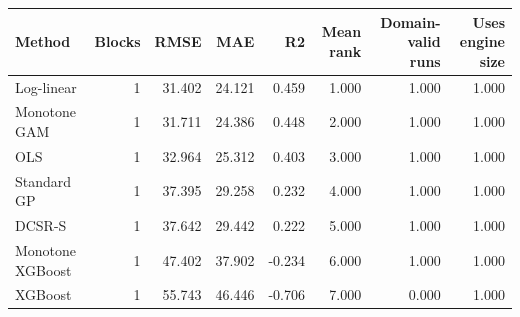 \begin{tabular}{lrrrrrrr}
\toprule
Method & Blocks & RMSE & MAE & R2 & Mean rank & Domain-valid runs & Uses engine size \\
\midrule
Log-linear & 1 & 31.402 & 24.121 & 0.459 & 1.000 & 1.000 & 1.000 \\
Monotone GAM & 1 & 31.711 & 24.386 & 0.448 & 2.000 & 1.000 & 1.000 \\
OLS & 1 & 32.964 & 25.312 & 0.403 & 3.000 & 1.000 & 1.000 \\
Standard GP & 1 & 37.395 & 29.258 & 0.232 & 4.000 & 1.000 & 1.000 \\
DCSR-S & 1 & 37.642 & 29.442 & 0.222 & 5.000 & 1.000 & 1.000 \\
Monotone XGBoost & 1 & 47.402 & 37.902 & -0.234 & 6.000 & 1.000 & 1.000 \\
XGBoost & 1 & 55.743 & 46.446 & -0.706 & 7.000 & 0.000 & 1.000 \\
\bottomrule
\end{tabular}
